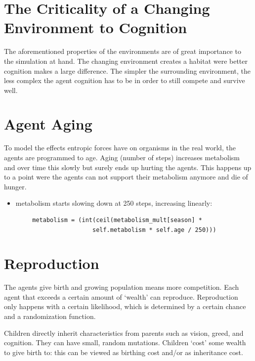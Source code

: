 \section{The Criticality of a Changing Environment to Cognition}
The aforementioned properties of the environments are of great importance to the simulation at hand. The changing environment creates a habitat were better cognition makes a large difference. The simpler the surrounding environment, the less complex the agent cognition has to be in order to still compete and survive well.

\section{Agent Aging}
To model the effects entropic forces have on organisms in the real world, the agents are programmed to age. Aging (number of steps) increases metabolism and over time this slowly but surely ends up hurting the agents. This happens up to a point were the agents can not support their metabolism anymore and die of hunger. 

\begin{itemize}
    \item metabolism starts slowing down at 250 steps, increasing linearly:
\end{itemize}
\begin{verbatim}
        metabolism = (int(ceil(metabolism_mult[season] * 
                         self.metabolism * self.age / 250)))
\end{verbatim}

\section{Reproduction}

The agents give birth and growing population means more competition. Each agent that exceeds a certain amount of `wealth' can reproduce. Reproduction only happens with a certain likelihood, which is determined by a certain chance and a randomization function.

Children directly inherit characteristics from parents such as vision, greed, and cognition. They can have small, random mutations.
Children `cost' some wealth to give birth to: this can be viewed as birthing cost and/or as inheritance cost.

